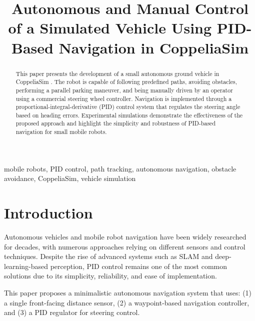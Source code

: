 \documentclass[conference]{IEEEtran}
\begin{document}


\title{Autonomous and Manual Control of a Simulated Vehicle Using PID-Based Navigation in CoppeliaSim}

\author{
}

\maketitle

\begin{abstract}
This paper presents the development of a small autonomous ground vehicle in CoppeliaSim \cite{coppeliaSim}. The robot is capable of following predefined paths, avoiding obstacles, performing a parallel parking maneuver, and being manually driven by an operator using a commercial steering wheel controller. Navigation is implemented through a proportional-integral-derivative (PID) control system that regulates the steering angle based on heading errors. Experimental simulations demonstrate the effectiveness of the proposed approach and highlight the simplicity and robustness of PID-based navigation for small mobile robots.
\end{abstract}

\begin{IEEEkeywords}
mobile robots, PID control, path tracking, autonomous navigation, obstacle avoidance, CoppeliaSim, vehicle simulation
\end{IEEEkeywords}

\section{Introduction}
Autonomous vehicles and mobile robot navigation have been widely researched for decades, with numerous approaches relying on different sensors and control techniques. Despite the rise of advanced systems such as SLAM and deep-learning-based perception, PID control remains one of the most common solutions due to its simplicity, reliability, and ease of implementation.

This paper proposes a minimalistic autonomous navigation system that uses:  
(1) a single front-facing distance sensor,  
(2) a waypoint-based navigation controller, and  
(3) a PID regulator for steering control.
\end{document}
